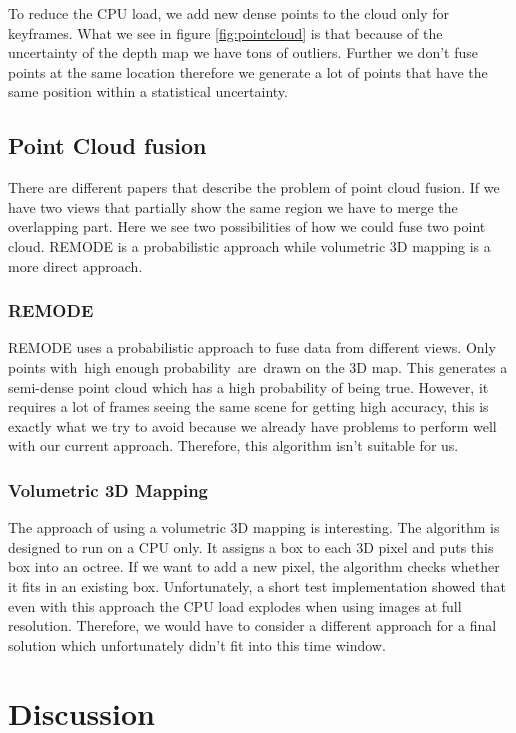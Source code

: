 \documentclass[11pt,a4paper,titlepage,oneside]{report}
\begin{document}
To reduce the CPU load, we add new dense points to the cloud only for keyframes. What we see in figure \ref{fig:pointcloud} is that because of the uncertainty of the depth map we have tons of outliers. Further we don’t fuse points at the same location therefore we generate a lot of points that have the same position within a statistical uncertainty.

\section{Point Cloud fusion}

There are different papers that describe the problem of point cloud fusion. If we have two views that partially show the same region we have to merge the overlapping part. Here we see two possibilities of how we could fuse two point cloud. REMODE is a probabilistic approach while volumetric 3D mapping is a more direct approach.

\subsection{REMODE}

REMODE uses a probabilistic approach to fuse data from different views. Only points with high enough probability are drawn on the 3D map. This generates a semi-dense point cloud which has a high probability of being true. However, it requires a lot of frames seeing the same scene for getting high accuracy, this is exactly what we try to avoid because we already have problems to perform well with our current approach. Therefore, this algorithm isn’t suitable for us.

\subsection{Volumetric 3D Mapping}

The approach of using a volumetric 3D mapping is interesting. The algorithm is designed to run on a CPU only. It assigns a box to each 3D pixel and puts this box into an octree. If we want to add a new pixel, the algorithm checks whether it fits in an existing box. Unfortunately, a short test implementation showed that even with this approach the CPU load explodes when using images at full resolution. Therefore, we would have to consider a different approach for a final solution which unfortunately didn’t fit into this time window.

\chapter{Discussion}
\end{document}
